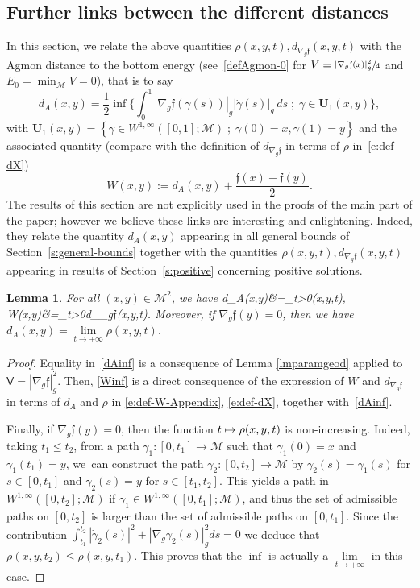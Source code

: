 \documentclass[JEP,XML,SOM,Unicode]{cedram}
\newcommand\mto{\mathchoice{\longmapsto}{\mapsto}{\mapsto}{\mapsto}}
\newcommand{\sep}{\;;\;}
\newtheorem{lemma}{Lemma}[section]
\theoremstyle{definition}
\newcommand{\M}{\ensuremath{\mathcal M}}
\newcommand{\f}{\ensuremath{\mathfrak{f}}}
\def\baln#1\naln{\begin{align}#1\end{align}}
\newcommand\bnp{\begin{proof}}
\newcommand\enp{\end{proof}}
\newcommand\nablag{\nabla_{g}}
\begin{document}
\subsection{Further links between the different distances}
\label{s:app-further-links}
In this section, we relate the above quantities $\rho(x,y,t), d_{\nablag \f}(x,y,t)$ with the Agmon distance to the bottom energy (see~\ref{defAgmon-0} for $V = \sfrac{| \nabla_g \f(x)|_g^2}{4}$ and $E_0 = \min_\M V = 0$), that is to say
\begin{equation}
\label{e:def-dA-Appendix}
d_{A}(x,y) = \frac12 \inf \biggl\{ \int_0^1|\nabla_g \f(\gamma(s))|_g |\dot{\gamma}(s)|_g\, ds\sep \gamma \in \mathbf{U}_1(x,y) \biggr\},
\end{equation}
with $\mathbf{U}_1(x,y)= \left\{ \gamma \in W^{1,\infty} ([0,1] ; \M )\sep\gamma(0)=x, \gamma(1)= y \right\}$ and the associated quantity (compare with the definition of $d_{\nablag \f}$ in terms of $\rho$ in~\eqref{e:def-dX})\enlargethispage{-\baselineskip}%
\begin{equation}
\label{e:def-W-Appendix}
W(x,y) := d_{A}(x,y)+\frac{\f(x)-\f(y)}{2}.
\end{equation}
The results of this section are not explicitly used in the proofs of the main part of the paper; however we believe these links are interesting and enlightening. Indeed, they relate the quantity $d_{A}(x,y)$ appearing in all general bounds of Section~\ref{s:general-bounds} together with the quantities $\rho(x,y,t), d_{\nablag \f}(x,y,t)$ appearing in results of Section~\ref{s:positive} concerning positive solutions.
\begin{lemma}
For all $(x,y)\in \M^2$, we have
\baln
\label{dAinf}
d_{A}(x,y)&=\inf_{t>0}\rho(x,y,t),\\
\label{Winf}W(x,y)&=\inf_{t>0}d_{\nablag \f}(x,y,t).
\naln
Moreover, if $\nabla_g\f(y)=0$, then we have $d_{A}(x,y) =\underset{t\to+\infty}{\lim}\rho(x,y,t)$.

\end{lemma}
\bnp
Equality in~\eqref{dAinf} is a consequence of Lemma \ref{lmparamgeod} applied to $\mathsf{V}=|\nabla_g\f|_g^2$.
Then, \eqref{Winf} is a direct consequence of the expression of $W$ and $d_{\nablag \f}$ in terms of $d_A$ and $\rho$ in \eqref{e:def-W-Appendix}, \eqref{e:def-dX}, together with~\eqref{dAinf}.

Finally, if $\nabla_g\f(y)=0$, then the function $t\mto \rho(x,y,t)$ is non-increasing. Indeed, taking $t_1\leq t_2$, from a path $\gamma_1: [0,t_1]\to \M$ such that $\gamma_1(0)=x$ and $\gamma_1(t_1)=y$, we~can construct the path $\gamma_2:[0,t_2]\to \M$ by $\gamma_2(s)=\gamma_1(s)$ for $s\in [0,t_1]$ and \hbox{$\gamma_2(s) = y$} for $s\in[t_1,t_2]$. This yields a path in $W^{1,\infty}([0,t_2];\M)$ if $\gamma_1 \in W^{1,\infty}([0,t_1];\M)$, and thus the set of admissible paths on $[0,t_2]$ is larger than the set of admissible paths on $[0,t_1]$. Since the contribution $\int_{t_1}^{t_2} |\dot{\gamma}_2(s)|^2 + |\nabla_g\gamma_2(s)|_g^2 ds= 0$ we deduce that $\rho(x,y,t_2)\leq \rho(x,y,t_1)$. This proves that the $\inf$ is actually a $\underset{t\to+\infty}{\lim}$ in this case.
\enp
\end{document}
